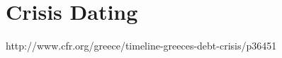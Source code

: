 \documentclass[/../base.tex]{subfiles}
\begin{document}
\section{Crisis Dating}
\label{a:crisis_dates}

http://www.cfr.org/greece/timeline-greeces-debt-crisis/p36451
\end{document}
